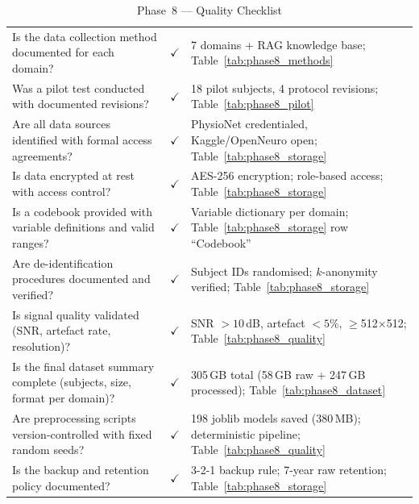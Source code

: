 \begin{xltabular}{\textwidth}{@{} X c X @{}}
\caption{Phase~8 --- Quality Checklist}
\label{tab:phase8_checklist}\\
\toprule
{} &  &  \\
\midrule
\endfirsthead
\endhead
\bottomrule
\endlastfoot
Is the data collection method documented for each domain?                    & $\checkmark$ & 7 domains + RAG knowledge base; Table~\ref{tab:phase8_methods} \\
Was a pilot test conducted with documented revisions?                        & $\checkmark$ & 18 pilot subjects, 4 protocol revisions; Table~\ref{tab:phase8_pilot} \\
Are all data sources identified with formal access agreements?               & $\checkmark$ & PhysioNet credentialed, Kaggle/OpenNeuro open; Table~\ref{tab:phase8_storage} \\
Is data encrypted at rest with access control?                               & $\checkmark$ & AES-256 encryption; role-based access; Table~\ref{tab:phase8_storage} \\
Is a codebook provided with variable definitions and valid ranges?           & $\checkmark$ & Variable dictionary per domain; Table~\ref{tab:phase8_storage} row ``Codebook'' \\
Are de-identification procedures documented and verified?                    & $\checkmark$ & Subject IDs randomised; $k$-anonymity verified; Table~\ref{tab:phase8_storage} \\
Is signal quality validated (SNR, artefact rate, resolution)?                & $\checkmark$ & SNR $> 10$\,dB, artefact $< 5\%$, $\geq$512$\times$512; Table~\ref{tab:phase8_quality} \\
Is the final dataset summary complete (subjects, size, format per domain)?   & $\checkmark$ & 305\,GB total (58\,GB raw + 247\,GB processed); Table~\ref{tab:phase8_dataset} \\
Are preprocessing scripts version-controlled with fixed random seeds?        & $\checkmark$ & 198 joblib models saved (380\,MB); deterministic pipeline; Table~\ref{tab:phase8_quality} \\
Is the backup and retention policy documented?                               & $\checkmark$ & 3-2-1 backup rule; 7-year raw retention; Table~\ref{tab:phase8_storage} \\
\end{xltabular}
\endgroup

\clearpage
